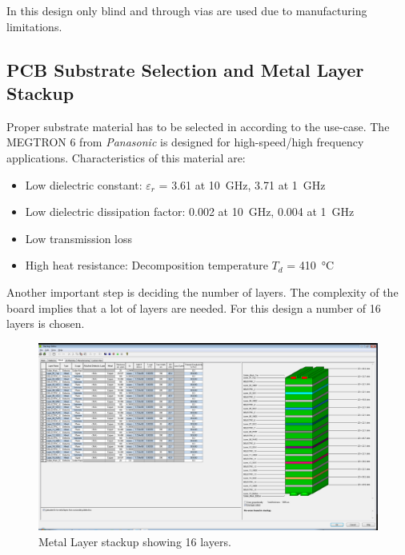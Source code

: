 In this design only blind and through vias are used due to manufacturing limitations.

\subsection{PCB Substrate Selection and Metal Layer Stackup}\label{ssec:substrate}
Proper substrate material has to be selected in according to the use-case.
The MEGTRON 6 from \textit{Panasonic} is designed for high-speed/high frequency applications. 
Characteristics of this material are:
\begin{itemize}
\item Low dielectric constant: $\varepsilon_r$ = 3.61 at \SI{10}{\giga \hertz}, 3.71 at \SI{1}{\giga \hertz}
\item Low dielectric dissipation factor: 0.002 at \SI{10}{\giga \hertz}, 0.004 at \SI{1}{\giga \hertz}
\item Low transmission loss
\item High heat resistance: Decomposition temperature $T_d$ = \SI{410}{\celsius}
\end{itemize}

Another important step is deciding the number of layers. The complexity of the board implies that a lot of layers are needed. 
For this design a number of 16 layers is chosen.

\begin{figure}[tbh]
	\centering
	\includegraphics[width = \textwidth]{chap/04-work/img/stackup}
	\caption[Metal Layer Stackup]{Metal Layer stackup showing 16 layers.} 
	\label{fig:layers}
\end{figure}

